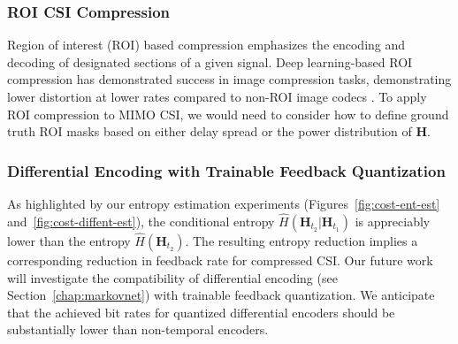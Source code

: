 \subsubsection{ROI CSI Compression}

Region of interest (ROI) based compression emphasizes the encoding and decoding of designated sections of a given signal. Deep learning-based ROI compression has demonstrated success in image compression tasks, demonstrating lower distortion at lower rates compared to non-ROI image codecs \cite{ref:Cai2020EndToEndOptimizedROIImageCompression}. To apply ROI compression to MIMO CSI, we would need to consider how to define ground truth ROI masks based on either delay spread or the power distribution of $\mathbf H$.

\subsubsection{Differential Encoding with Trainable Feedback Quantization}

As highlighted by our entropy estimation experiments (Figures~\ref{fig:cost-ent-est} and~\ref{fig:cost-diffent-est}), the conditional entropy $\hat H(\mathbf H_{t_2}|\mathbf H_{t_1})$ is appreciably lower than the entropy $\hat H(\mathbf H_{t_2})$. The resulting entropy reduction implies a corresponding reduction in feedback rate for compressed CSI. Our future work will investigate the compatibility of differential encoding (see Section~\ref{chap:markovnet}) with trainable feedback quantization. We anticipate that the achieved bit rates for quantized differential encoders should be substantially lower than non-temporal encoders.
